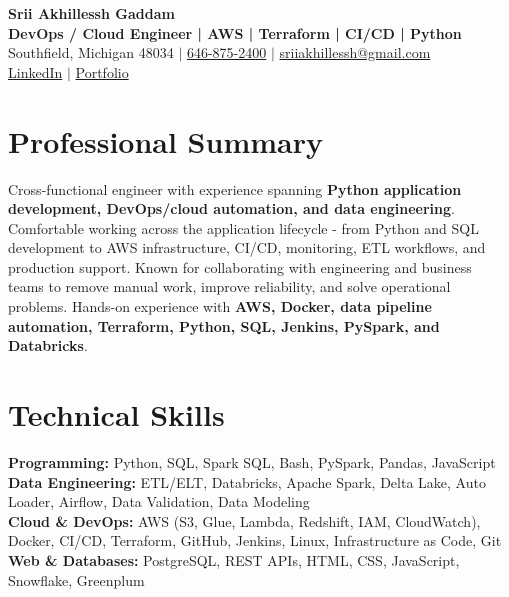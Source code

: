 \documentclass[letterpaper,10pt]{article}
\begin{document}
\fontsize{9.35pt}{10.45pt}\selectfont

\begin{center}
    {\LARGE \textbf{Srii Akhillessh Gaddam}} \\[-1pt]
    \textbf{DevOps / Cloud Engineer | AWS | Terraform | CI/CD | Python} \\[2pt]
    Southfield, Michigan 48034 $|$
    \href{tel:6468752400}{646-875-2400} $|$
    \href{mailto:sriiakhillessh@gmail.com}{sriiakhillessh@gmail.com} \\[1pt]
    \href{https://www.linkedin.com/in/srii-akhiilessh-gaddam-b48668191/}{LinkedIn} $|$
    \href{https://sriiakhillesshg.github.io/portfolio/}{Portfolio}
\end{center}
\vspace{-8pt}

\section{Professional Summary}
\small{Cross-functional engineer with experience spanning \textbf{Python application development, DevOps/cloud automation, and data engineering}. Comfortable working across the application lifecycle - from Python and SQL development to AWS infrastructure, CI/CD, monitoring, ETL workflows, and production support. Known for collaborating with engineering and business teams to remove manual work, improve reliability, and solve operational problems. Hands-on experience with \textbf{AWS, Docker, data pipeline automation, Terraform, Python, SQL, Jenkins, PySpark, and Databricks}.}

\section{Technical Skills}
\small{
\textbf{Programming:} Python, SQL, Spark SQL, Bash, PySpark, Pandas, JavaScript \\
\textbf{Data Engineering:} ETL/ELT, Databricks, Apache Spark, Delta Lake, Auto Loader, Airflow, Data Validation, Data Modeling \\
\textbf{Cloud \& DevOps:} AWS (S3, Glue, Lambda, Redshift, IAM, CloudWatch), Docker, CI/CD, Terraform, GitHub, Jenkins, Linux, Infrastructure as Code, Git \\
\textbf{Web \& Databases:} PostgreSQL, REST APIs, HTML, CSS, JavaScript, Snowflake, Greenplum
}
\end{document}
